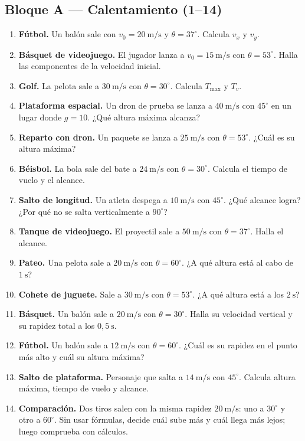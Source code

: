 \documentclass[12pt, letterpaper]{article}
\begin{document}
\subsection*{Bloque A — Calentamiento \facil\hspace{0.7em}(1--14)}

\begin{enumerate}[leftmargin=*, label=\textbf{\arabic*.}]
  \item \textbf{Fútbol.} Un balón sale con $v_0=20\ \text{m/s}$ y
        $\theta=37^\circ$. Calcula $v_x$ y $v_y$.
  \item \textbf{Básquet de videojuego.} El jugador lanza a
        $v_0=15\ \text{m/s}$ con $\theta=53^\circ$. Halla las componentes
        de la velocidad inicial.
  \item \textbf{Golf.} La pelota sale a $30\ \text{m/s}$ con
        $\theta=30^\circ$. Calcula $T_{\max}$ y $T_v$.
  \item \textbf{Plataforma espacial.} Un dron de prueba se lanza a
        $40\ \text{m/s}$ con $45^\circ$ en un lugar donde $g=10$.
        ¿Qué altura máxima alcanza?
  \item \textbf{Reparto con dron.} Un paquete se lanza a
        $25\ \text{m/s}$ con $\theta=53^\circ$. ¿Cuál es su altura máxima?
  \item \textbf{Béisbol.} La bola sale del bate a $24\ \text{m/s}$ con
        $\theta=30^\circ$. Calcula el tiempo de vuelo y el alcance.
  \item \textbf{Salto de longitud.} Un atleta despega a
        $10\ \text{m/s}$ con $45^\circ$. ¿Qué alcance logra? ¿Por qué no
        se salta verticalmente a $90^\circ$?
  \item \textbf{Tanque de videojuego.} El proyectil sale a
        $50\ \text{m/s}$ con $\theta=37^\circ$. Halla el alcance.
  \item \textbf{Pateo.} Una pelota sale a $20\ \text{m/s}$ con
        $\theta=60^\circ$. ¿A qué altura está al cabo de $1\ \text{s}$?
  \item \textbf{Cohete de juguete.} Sale a $30\ \text{m/s}$ con
        $\theta=53^\circ$. ¿A qué altura está a los $2\ \text{s}$?
  \item \textbf{Básquet.} Un balón sale a $20\ \text{m/s}$ con
        $\theta=30^\circ$. Halla su velocidad vertical y su rapidez total
        a los $0{,}5\ \text{s}$.
  \item \textbf{Fútbol.} Un balón sale a $12\ \text{m/s}$ con
        $\theta=60^\circ$. ¿Cuál es su rapidez en el punto más alto y
        cuál su altura máxima?
  \item \textbf{Salto de plataforma.} Personaje que salta a
        $14\ \text{m/s}$ con $45^\circ$. Calcula altura máxima, tiempo de
        vuelo y alcance.
  \item \textbf{Comparación.} Dos tiros salen con la misma rapidez
        $20\ \text{m/s}$: uno a $30^\circ$ y otro a $60^\circ$. Sin usar
        fórmulas, decide cuál sube más y cuál llega más lejos; luego
        comprueba con cálculos.
\end{enumerate}
\end{document}
